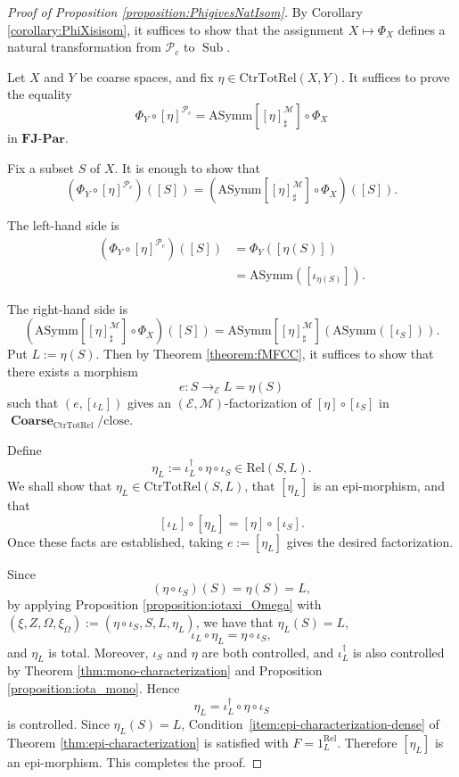 \documentclass[12pt, a4paper]{amsart}
\theoremstyle{definition}
\newcommand{\Coarse}{\mathop{\mathbf{Coarse}}\nolimits}
\newcommand{\Rel}{\mathrm{Rel}}
\newcommand{\CtrTotRel}{\mathrm{CtrTotRel}}
\newcommand{\close}{\mathrm{close}}
\newcommand{\AS}{\mathrm{ASymm}}
\newcommand{\FinJoinParOrd}{\mathbf{FJ}\text{-}\mathbf{Par}}
\newcommand{\Sub}{\operatorname{Sub}}
\begin{document}
\begin{proof}[Proof of Proposition \ref{proposition:PhigivesNatIsom}]
By Corollary \ref{corollary:PhiXisisom}, it suffices to show that the assignment $X\mapsto\Phi_X$ defines a natural transformation from $\mathcal{P}_c$ to $\Sub$.

Let $X$ and $Y$ be coarse spaces, and fix $\eta\in\CtrTotRel(X,Y)$. It suffices to prove the equality
\[
\Phi_Y\circ[\eta]^{\mathcal{P}_c}
=
\AS[[\eta]^{\mathcal{M}}_{\sharp}] \circ\Phi_X
\]
in $\FinJoinParOrd$.

Fix a subset $S$ of $X$. It is enough to show that
\[
(\Phi_Y\circ[\eta]^{\mathcal{P}_c})([S])
=
(\AS[[\eta]^{\mathcal{M}}_{\sharp}]\circ\Phi_X)([S]).
\]

The left-hand side is
\begin{align*}
(\Phi_Y\circ[\eta]^{\mathcal{P}_c})([S])
    &= \Phi_Y([\eta(S)]) \\
    &= \AS([\iota_{\eta(S)}]).
\end{align*}

The right-hand side is
\[
(\AS[[\eta]^{\mathcal{M}}_{\sharp}] \circ\Phi_X)([S])
=
\AS[[\eta]^{\mathcal{M}}_{\sharp}](\AS([\iota_S])).
\]
Put $L:=\eta(S)$. 
Then by Theorem \ref{theorem:fMFCC}, 
it suffices to show that there exists a morphism
\[
e:S\rightarrow_{\mathcal{E}}L = \eta(S)
\]
such that $(e,[\iota_L])$ gives an $(\mathcal{E},\mathcal{M})$-factorization of
$[\eta]\circ[\iota_S]$ in $\Coarse_{\CtrTotRel}/{\close}$.

Define
\[
\eta_L
:=
\iota_L^\dagger\circ\eta\circ\iota_S
\in
\Rel(S,L).
\]
We shall show that
$\eta_L\in\CtrTotRel(S,L)$,
that
$[\eta_L]$ is an epi-morphism,
and that
\[
[\iota_L]\circ[\eta_L]
=
[\eta]\circ[\iota_S].
\]
Once these facts are established, taking
$e:=[\eta_L]$
gives the desired factorization.

Since
\[
(\eta\circ\iota_S)(S)
=
\eta(S)
=
L,
\]
by applying Proposition \ref{proposition:iotaxi_Omega}
with $(\xi,Z,\Omega,\xi_{\Omega}) := (\eta \circ \iota_S,S,L,\eta_L)$, 
we have that $\eta_L(S)=L$, 
\[
\iota_L\circ\eta_L = \eta\circ\iota_S, 
\]
and 
$\eta_L$ is total.
Moreover,
$\iota_S$ and $\eta$ are both controlled, and
$\iota_L^\dagger$ is also controlled by
Theorem \ref{thm:mono-characterization}
and Proposition \ref{proposition:iota_mono}.
Hence
\[
\eta_L
=
\iota_L^\dagger\circ\eta\circ\iota_S
\]
is controlled.
Since
$\eta_L(S)=L$,
Condition~\eqref{item:epi-characterization-dense}
of Theorem \ref{thm:epi-characterization} is satisfied with
$F=1_L^{\Rel}$.
Therefore
$[\eta_L]$
is an epi-morphism.
This completes the proof.
\end{proof}
\end{document}
